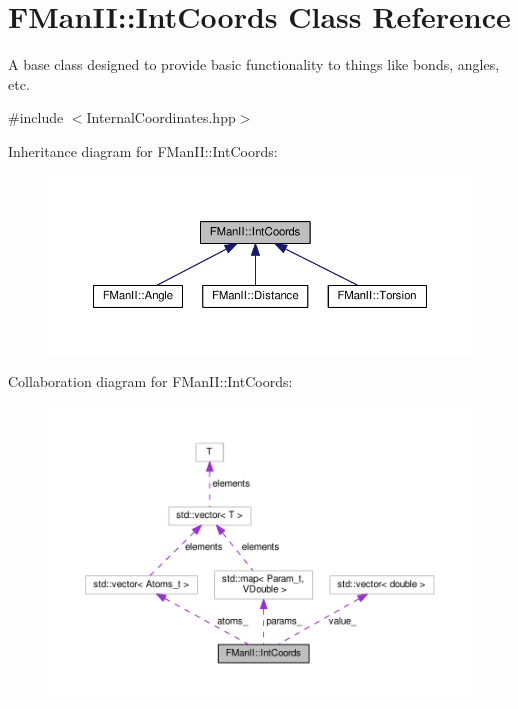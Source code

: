 \hypertarget{classFManII_1_1IntCoords}{}\section{F\+Man\+II\+:\+:Int\+Coords Class Reference}
\label{classFManII_1_1IntCoords}


A base class designed to provide basic functionality to things like bonds, angles, etc.  




{\ttfamily \#include $<$Internal\+Coordinates.\+hpp$>$}



Inheritance diagram for F\+Man\+II\+:\+:Int\+Coords\+:\nopagebreak
\begin{figure}[H]
\begin{center}
\leavevmode
\includegraphics[width=350pt]{classFManII_1_1IntCoords__inherit__graph}
\end{center}
\end{figure}


Collaboration diagram for F\+Man\+II\+:\+:Int\+Coords\+:\nopagebreak
\begin{figure}[H]
\begin{center}
\leavevmode
\includegraphics[width=350pt]{classFManII_1_1IntCoords__coll__graph}
\end{center}
\end{figure}
